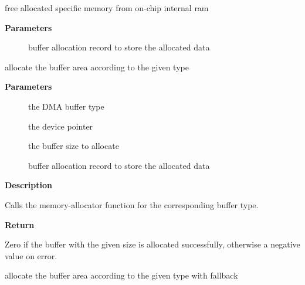 \documentclass[a4paper,8pt,english]{sphinxmanual}
\begin{document}
\begin{fulllineitems}
\label{sound/kernel-api/alsa-driver-api:c.snd_free_dev_iram}
free allocated specific memory from on-chip internal ram

\end{fulllineitems}


\textbf{Parameters}
\begin{description}
\item[{}] \leavevmode
buffer allocation record to store the allocated data

\end{description}

\begin{fulllineitems}
\label{sound/kernel-api/alsa-driver-api:c.snd_dma_alloc_pages}
allocate the buffer area according to the given type

\end{fulllineitems}


\textbf{Parameters}
\begin{description}
\item[{}] \leavevmode
the DMA buffer type

\item[{}] \leavevmode
the device pointer

\item[{}] \leavevmode
the buffer size to allocate

\item[{}] \leavevmode
buffer allocation record to store the allocated data

\end{description}

\textbf{Description}

Calls the memory-allocator function for the corresponding
buffer type.

\textbf{Return}

Zero if the buffer with the given size is allocated successfully,
otherwise a negative value on error.

\begin{fulllineitems}
\label{sound/kernel-api/alsa-driver-api:c.snd_dma_alloc_pages_fallback}
allocate the buffer area according to the given type with fallback

\end{fulllineitems}
\end{document}
